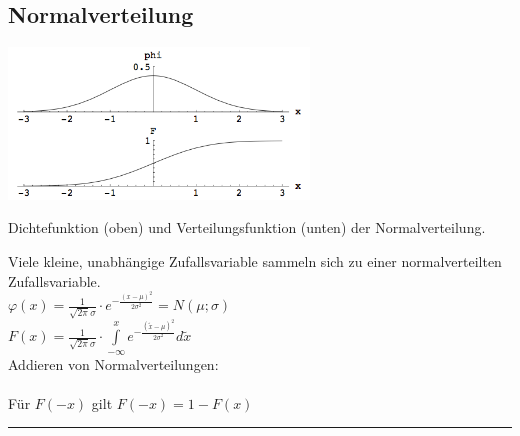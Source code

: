 \newpage

	\subsection{Normalverteilung }
    \begin{floatingfigure}[r]{8cm}
      \includegraphics[width=8cm]{./bilder/normalverteilung.png}
      \caption{Dichtefunktion (oben) und Verteilungsfunktion (unten) der
        Normalverteilung.}
   	\end{floatingfigure}
    
    Viele kleine, unabhängige Zufallsvariable sammeln sich zu einer
    normalverteilten Zufallsvariable.\\
    $\varphi(x)=\frac{1}{\sqrt{2
    \pi}\sigma}\cdot e^{-\frac{(x-\mu)^2}{2\sigma^2}} = N(\mu ; \sigma) $\\ 
    $F(x)=\frac{1}{\sqrt{2\pi}\sigma}\cdot \int\limits^{x}_{-\infty}{e^{-\frac{(\tilde{x} -\mu)^2}{2\sigma^2}}} d\tilde{x} $ \\
    Addieren von Normalverteilungen: \\
     \\
    Für $F(-x)$ gilt $F(-x) = 1 - F(x)$
    
  \vspace{2cm}
  
	\hrule
  
